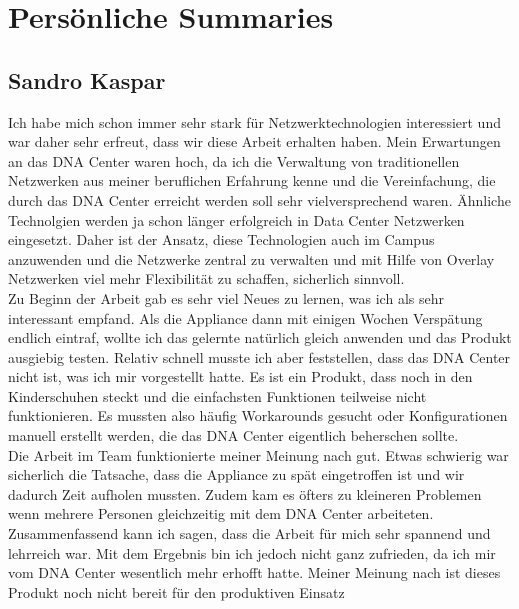 \section{Persönliche Summaries}
\subsection{Sandro Kaspar}
Ich habe mich schon immer sehr stark für Netzwerktechnologien interessiert und war daher sehr erfreut, dass wir diese Arbeit erhalten haben. Mein Erwartungen an das DNA Center waren hoch, da ich die Verwaltung von traditionellen Netzwerken aus meiner beruflichen Erfahrung kenne und die Vereinfachung, die durch das DNA Center erreicht werden soll sehr vielversprechend waren. Ähnliche Technolgien werden ja schon länger erfolgreich in Data Center Netzwerken eingesetzt. Daher ist der Ansatz, diese Technologien auch im Campus anzuwenden und die Netzwerke zentral zu verwalten und mit Hilfe von Overlay Netzwerken viel mehr Flexibilität zu schaffen, sicherlich sinnvoll. \\
Zu Beginn der Arbeit gab es sehr viel Neues zu lernen, was ich als sehr interessant empfand. Als die Appliance dann mit einigen Wochen Verspätung endlich eintraf, wollte ich das gelernte natürlich gleich anwenden und das Produkt ausgiebig testen. Relativ schnell musste ich aber feststellen, dass das DNA Center nicht ist, was ich mir vorgestellt hatte. Es ist ein Produkt, dass noch in den Kinderschuhen steckt und die einfachsten Funktionen teilweise nicht funktionieren. Es mussten also häufig Workarounds gesucht oder Konfigurationen manuell erstellt werden, die das DNA Center eigentlich beherschen sollte. \\
Die Arbeit im Team funktionierte meiner Meinung nach gut. Etwas schwierig war sicherlich die Tatsache, dass die Appliance zu spät eingetroffen ist und wir dadurch Zeit aufholen mussten. Zudem kam es öfters zu kleineren Problemen wenn mehrere Personen gleichzeitig mit dem DNA Center arbeiteten. \\
Zusammenfassend kann ich sagen, dass die Arbeit für mich sehr spannend und lehrreich war. Mit dem Ergebnis bin ich jedoch nicht ganz zufrieden, da ich mir vom DNA Center wesentlich mehr erhofft hatte. Meiner Meinung nach ist dieses Produkt noch nicht bereit für den produktiven Einsatz

